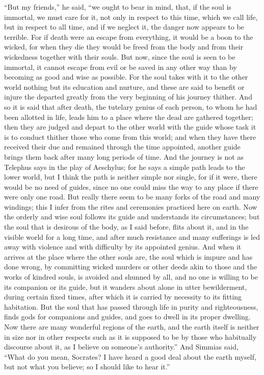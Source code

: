 \documentclass[letterpaper,12pt]{article}
\newcommand{\stephpag}[1]{\marginnote{\small\itshape\fontfamily{ppl}\selectfont #1}}
\begin{document}
\begin{drama}
``But my friends,'' he said, ``we ought to bear in mind, \stephpag{c} that, if the soul is immortal, we must care for it, not only in respect to this time, which we call life, but in respect to all time, and if we neglect it, the danger now appears to be terrible. For if death were an escape from everything, it would be a boon to the wicked, for when they die they would be freed from the body and from their wickedness together with their souls. But now, since the soul is seen to be immortal, it cannot escape \stephpag{d} from evil or be saved in any other way than by becoming as good and wise as possible. For the soul takes with it to the other world nothing but its education and nurture, and these are said to benefit or injure the departed greatly from the very beginning of his journey thither. And so it is said that after death, the tutelary genius of each person, to whom he had been allotted in life, leads him to a place where the dead are gathered together; then they are judged and depart to the other world \stephpag{e} with the guide whose task it is to conduct thither those who come from this world; and when they have there received their due and remained through the time appointed, another guide brings them back after many long periods of time. And the journey is not as Telephus says in the play of Aeschylus; \stephpag{108 a} for he says a simple path leads to the lower world, but I think the path is neither simple nor single, for if it were, there would be no need of guides, since no one could miss the way to any place if there were only one road. But really there seem to be many forks of the road and many windings; this I infer from the rites and ceremonies practiced here on earth. Now the orderly and wise soul follows its guide and understands its circumstances; but the soul that is desirous of the body, as I said before, flits about it, and in the visible world for a long time, \stephpag{b} and after much resistance and many sufferings is led away with violence and with difficulty by its appointed genius. And when it arrives at the place where the other souls are, the soul which is impure and has done wrong, by committing wicked murders or other deeds akin to those and the works of kindred souls, is avoided and shunned by all, and no one is willing to be its companion or its guide, \stephpag{c} but it wanders about alone in utter bewilderment, during certain fixed times, after which it is carried by necessity to its fitting habitation. But the soul that has passed through life in purity and righteousness, finds gods for companions and guides, and goes to dwell in its proper dwelling. Now there are many wonderful regions of the earth, and the earth itself is neither in size nor in other respects such as it is supposed to be by those who habitually discourse about it, as I believe on someone's authority.'' \stephpag{d} And Simmias said, ``What do you mean, Socrates? I have heard a good deal about the earth myself, but not what you believe; so I should like to hear it.''
 

\end{drama}
\end{document}
